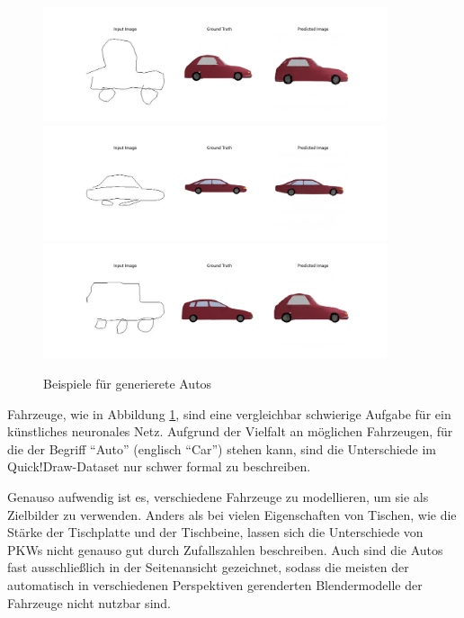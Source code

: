 \begin{figure}[h]
	\centering
	\includegraphics[width=0.9\textwidth]{bilder/pix2pix_progress/car_small.png}
	\includegraphics[width=0.9\textwidth]{bilder/pix2pix_progress/car_limo.png}
	\includegraphics[width=0.9\textwidth]{bilder/pix2pix_progress/car_kombi.png}
	\caption[Generierte Autos]{Beispiele für generierete Autos}
	\label{fig:pix2pixcars}
\end{figure}

Fahrzeuge, wie in Abbildung \ref{fig:pix2pixcars}, sind eine vergleichbar schwierige Aufgabe für ein künstliches neuronales Netz. Aufgrund der Vielfalt an möglichen Fahrzeugen, für die der Begriff ``Auto'' (englisch ``Car'') stehen kann, sind die Unterschiede im Quick!Draw-Dataset nur schwer formal zu beschreiben.

Genauso aufwendig ist es, verschiedene Fahrzeuge zu modellieren, um sie als Zielbilder zu verwenden. Anders als bei vielen Eigenschaften von Tischen, wie die Stärke der Tischplatte und der Tischbeine, lassen sich die Unterschiede von PKWs nicht genauso gut durch Zufallszahlen beschreiben. Auch sind die Autos fast ausschließlich in der Seitenansicht gezeichnet, sodass die meisten der automatisch in verschiedenen Perspektiven gerenderten Blendermodelle der Fahrzeuge nicht nutzbar sind.

